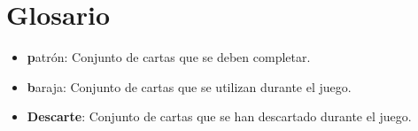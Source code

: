 \documentclass[60pt]{article}
\begin{document}
\clearpage
\section{Glosario}\label{cap:glosario}
\begin{itemize}
    \item \textbf patrón: Conjunto de cartas que se deben completar.
    \item \textbf baraja: Conjunto de cartas que se utilizan durante el juego.
    \item \textbf{Descarte}: Conjunto de cartas que se han descartado durante el juego.
\end{itemize}
\clearpage

\medskip
\printbibliography
\end{document}
